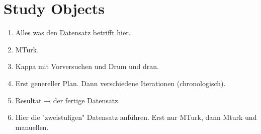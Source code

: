 \section{Study Objects}
\label{chp:study:sec:study_objects}
\begin{enumerate}
    \item Alles was den Datensatz betrifft hier.
    \item MTurk.
    \item Kappa mit Vorversuchen und Drum und dran.
    \item Erst genereller Plan. Dann verschiedene Iterationen (chronologisch).
    \item Resultat → der fertige Datensatz.
    \item Hier die "zweistufigen" Datensatz anführen. Erst nur MTurk, dann Mturk und manuellen.
\end{enumerate}

